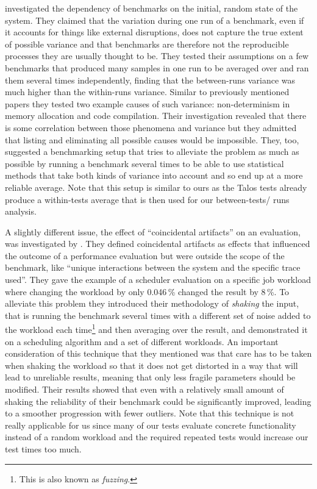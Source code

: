 \citet{kalibera_benchmark_2005} investigated the dependency of benchmarks on
the initial, random state of the system. They claimed that the variation during
one run of a benchmark, even if it accounts for things like external
disruptions, does not capture the true extent of possible variance and that
benchmarks are therefore not the reproducible processes they are usually
thought to be. They tested their assumptions on a few benchmarks that produced
many samples in one run to be averaged over and ran them several times
independently, finding that the between-runs variance was much higher than the
within-runs variance.
Similar to previously mentioned papers they tested two
example causes of such variance: non-determinism in memory allocation and code
compilation. Their investigation revealed that there is some correlation
between those phenomena and variance but they admitted that listing and
eliminating all possible causes would be impossible. They, too, suggested a
benchmarking setup that tries to alleviate the problem as much as possible by
running a benchmark several times to be able to use statistical methods that
take both kinds of variance into account and so end up at a more reliable
average. Note that this setup is similar to ours as the Talos tests already
produce a within-tests average that is then used for our between-tests\slash
runs analysis.

A slightly different issue, the effect of ``coincidental artifacts'' on an
evaluation, was investigated by \citet{tsafrir_reducing_2007}. They defined
coincidental artifacts as effects that influenced the outcome of a performance
evaluation but were outside the scope of the benchmark, like ``unique
interactions between the system and the specific trace used''. They gave the
example of a scheduler evaluation on a specific job workload where changing
the workload by only 0.046\,\% changed the result by 8\,\%. To alleviate this
problem they introduced their methodology of \emph{shaking} the input, that is
running the benchmark several times with a different set of noise added to the
workload each time\footnote{This is also known as \emph{fuzzing}.} and then
averaging over the result, and demonstrated it on a scheduling algorithm and a
set of different workloads. An important consideration of this technique that
they mentioned was that care has to be taken when shaking the workload so that
it does not get distorted in a way that will lead to unreliable results,
meaning that only less fragile parameters should be modified. Their results
showed that even with a relatively small amount of shaking the reliability of
their benchmark could be significantly improved, leading to a smoother
progression with fewer outliers. Note that this technique is not really
applicable for us since many of our tests evaluate concrete functionality
instead of a random workload and the required repeated tests would increase
our test times too much.

